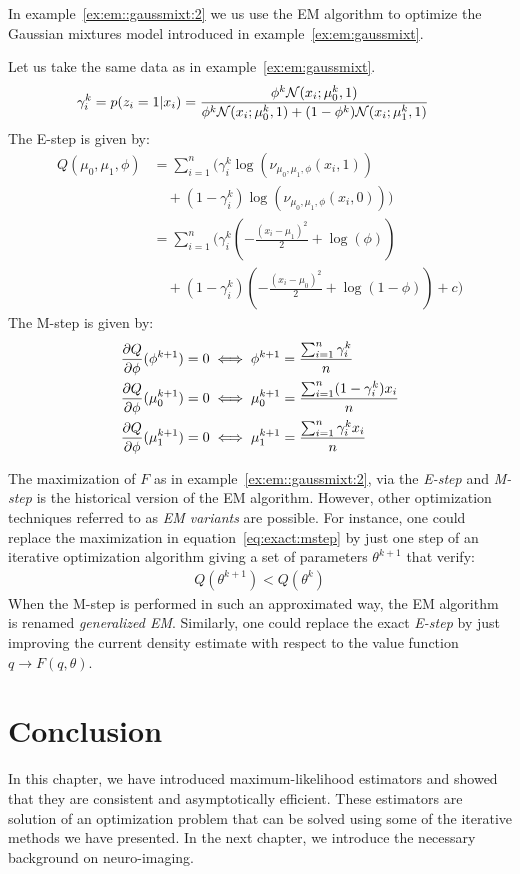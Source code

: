 In example~\ref{ex:em::gaussmixt:2} we us use the EM algorithm to optimize the Gaussian mixtures model introduced in example~\eqref{ex:em:gaussmixt}.
\begin{example}
  \label{ex:em::gaussmixt:2}
  Let us take the same data as in example~\ref{ex:em:gaussmixt}.
  \begin{align}
    \gamma_i^k = p(z_i = 1 | x_i) &= \frac{\phi^k \mathcal{N}(x_i; \mu_0^k, 1)}{ \phi^k \mathcal{N}(x_i; \mu_0^k, 1) + (1 - \phi^k) \mathcal{N}(x_i; \mu_1^k, 1)} 
  \end{align}
  The E-step is given by:
  \begin{align}
    Q(\mu_0, \mu_1, \phi) &= \sum_{i=1}^n \Big( \gamma_i^k \log(\nu_{\mu_0, \mu_1, \phi}(x_i, 1)) \\ &\enspace \enspace + (1 - \gamma_i^k) \log(\nu_{\mu_0, \mu_1, \phi}(x_i, 0)) \Big) \\
              &= \sum_{i=1}^n \Big( \gamma_i^k( -\frac{(x_i - \mu_1)^2}{2} + \log(\phi)) \\ &\enspace \enspace + (1 - \gamma_i^k) ( -\frac{(x_i - \mu_0)^2}{2} + \log(1 -\phi)) + c \Big)
 \end{align}
 The M-step is given by:
 \begin{align}
   &\frac{ \partial Q}{\partial \phi}(\phi^{k + 1}) = 0 \iff \phi^{k + 1} = \frac{\sum_{i=1}^n \gamma_i^k}{n} \\
   &\frac{ \partial Q}{\partial \phi}(\mu^{k+1}_0) = 0 \iff \mu^{k + 1}_0 = \frac{\sum_{i=1}^n (1 - \gamma_i^k) x_i}{n} \\
   &\frac{ \partial Q}{\partial \phi}(\mu^{k+1}_1) = 0 \iff \mu^{k + 1}_1 = \frac{\sum_{i=1}^n \gamma_i^k x_i}{n} \\
 \end{align}
\end{example}


The maximization of $F$ as in example~\ref{ex:em::gaussmixt:2}, via the \emph{E-step} and \emph{M-step} is the
historical version of the EM algorithm. However, other optimization techniques
referred to as \emph{EM variants}
are possible. For instance, one could replace the maximization in
equation~\eqref{eq:exact:mstep} by just one step of an iterative optimization
algorithm giving a set of parameters $\theta^{k+1}$ that verify:
\begin{align}
  Q(\theta^{k+1}) < Q(\theta^k) 
\end{align}
When the M-step is performed in such an approximated way, the EM algorithm
is renamed \emph{generalized EM}.
Similarly, one could replace the exact \emph{E-step} by just improving the
current density estimate with respect to the value function $q \rightarrow F(q,
\theta)$.

\section{Conclusion}
In this chapter, we have introduced maximum-likelihood estimators and showed
that they are consistent and asymptotically efficient. These estimators are
solution of an optimization problem that can be solved using some of the
iterative methods we have presented.
In the next chapter, we introduce the necessary background on neuro-imaging.
